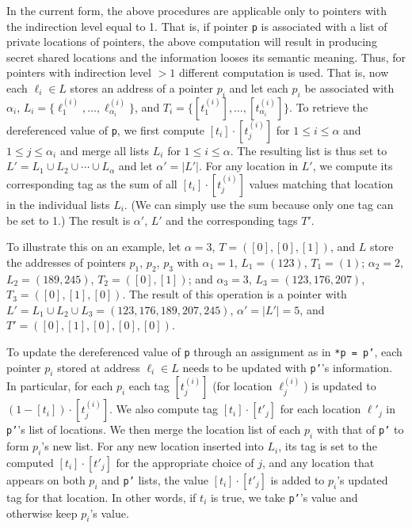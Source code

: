 \documentclass[11pt]{article}
\begin{document}
In the current form, the above procedures are applicable only to pointers
with the indirection level equal to 1. That is, if pointer \texttt{p} is
associated with a list of private locations of pointers, the above
computation will result in producing secret shared locations and the
information looses its semantic meaning. Thus, for pointers with indirection
level $>1$ different computation is used. That is, now each $\ell_i \in L$
stores an address of a pointer $p_i$ and let each $p_i$ be associated with
$\alpha_i$, $L_i = \{\ell^{(i)}_1, {\ldots}, \ell^{(i)}_{\alpha_i}\}$, and
$T_i = \{[t^{(i)}_1], {\ldots}, [t^{(i)}_{\alpha_i}]\}$. To retrieve the
dereferenced value of \texttt{p}, we first compute $[t_i] \cdot [t^{(i)}_j]$
for $1 \le i \le \alpha$ and $1 \le j \le {\alpha_i}$ and merge all lists
$L_i$ for $1\le i \le \alpha$. The resulting list is thus set to $L ' = L_1
\cup L_2 \cup {\cdots} \cup L_{\alpha}$ and let $\alpha' = |L'|$. For any
location in $L'$, we compute its corresponding tag as the sum of all $[t_i]
\cdot [t^{(i)}_j]$ values matching that location in the individual lists
$L_i$. (We can simply use the sum because only one tag can be set to 1.) The
result is $\alpha'$, $L'$ and the corresponding tags $T'$.

To illustrate this on an example, let $\alpha = 3$, $T = ([0], [0], [1])$,
and $L$ store the addresses of pointers $p_1$, $p_2$, $p_3$ with $\alpha_1 =
1$, $L_1 = (123)$, $T_1 = (1)$; $\alpha_2 = 2$, $L_2 = (189, 245)$, $T_2 =
([0], [1])$; and $\alpha_3 = 3$, $L_3 = (123, 176, 207)$, $T_3 = ([0], [1],
[0])$. The result of this operation is a pointer with $L' = L_1 \cup L_2
\cup L_3 = (123, 176, 189, 207, 245)$, $\alpha' = |L'| = 5$, and $T' = ([0],
[1], [0], [0], [0])$.

To update the dereferenced value of \texttt{p} through an assignment as in 
\texttt{*p = p'}, each pointer $p_i$ stored at address $\ell_i \in L$ needs
to be updated with \texttt{p'}'s information.  In particular, for each $p_i$
each tag $[t^{(i)}_j]$ (for location $\ell^{(i)}_j$) is updated to
$(1-[t_i]) \cdot [t^{(i)}_j]$. We also compute tag $[t_i] \cdot [t'_j]$ for
each location $\ell'_j$ in \texttt{p'}'s list of locations. We then merge
the location list of each $p_i$ with that of \texttt{p'} to form $p_i$'s new
list. For any new location inserted into $L_i$, its tag is set to the
computed $[t_i] \cdot [t'_j]$ for the appropriate choice of $j$, and any
location that appears on both $p_i$ and \texttt{p'} lists, the value
$[t_i] \cdot [t'_j]$ is added to $p_i$'s updated tag for that location. In
other words, if $t_i$ is true, we take \texttt{p'}'s value and otherwise
keep $p_i$'s value.
\end{document}

